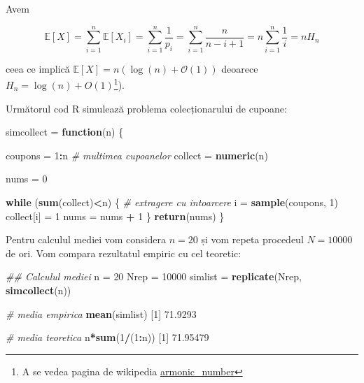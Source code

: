 \documentclass[]{article}
\newenvironment{Shaded}{\begin{snugshade}}{\end{snugshade}}
\newcommand{\CommentTok}[1]{\textcolor[rgb]{0.56,0.35,0.01}{\textit{#1}}}
\newcommand{\ControlFlowTok}[1]{\textcolor[rgb]{0.13,0.29,0.53}{\textbf{#1}}}
\newcommand{\DecValTok}[1]{\textcolor[rgb]{0.00,0.00,0.81}{#1}}
\newcommand{\FloatTok}[1]{\textcolor[rgb]{0.00,0.00,0.81}{#1}}
\newcommand{\KeywordTok}[1]{\textcolor[rgb]{0.13,0.29,0.53}{\textbf{#1}}}
\newcommand{\NormalTok}[1]{#1}
\newcommand{\OperatorTok}[1]{\textcolor[rgb]{0.81,0.36,0.00}{\textbf{#1}}}
\newcommand{\StringTok}[1]{\textcolor[rgb]{0.31,0.60,0.02}{#1}}
\let\rmarkdownfootnote\footnote%
\def\footnote{\protect\rmarkdownfootnote}
\begin{document}
Avem

\[
  \mathbb{E}[X] = \sum_{i = 1}^{n}\mathbb{E}[X_i] = \sum_{i = 1}^{n}\frac{1}{p_i} = \sum_{i = 1}^{n}\frac{n}{n-i+1} = n\sum_{i = 1}^{n}\frac{1}{i} = nH_n
\]

ceea ce implică
\(\mathbb{E}[X] = n\left(\log(n) + \mathcal{O}(1)\right)\) deoarece
\(H_n = \log(n)+O(1)\)\footnote{A se vedea pagina de wikipedia
  \href{https://en.wikipedia.org/wiki/Harmonic_number}{armonic\_number}}).

Următorul cod R simulează problema colecționarului de cupoane:

\begin{Shaded}
\begin{Highlighting}[]
\NormalTok{simcollect =}\StringTok{ }\ControlFlowTok{function}\NormalTok{(n) \{}
  
\NormalTok{coupons =}\StringTok{ }\DecValTok{1}\OperatorTok{:}\NormalTok{n }\CommentTok{# multimea cupoanelor}
\NormalTok{collect =}\StringTok{ }\KeywordTok{numeric}\NormalTok{(n)}

\NormalTok{nums =}\StringTok{ }\DecValTok{0}

\ControlFlowTok{while}\NormalTok{ (}\KeywordTok{sum}\NormalTok{(collect)}\OperatorTok{<}\NormalTok{n)}
\NormalTok{\{}
  \CommentTok{# extragere cu intoarcere}
\NormalTok{    i =}\StringTok{ }\KeywordTok{sample}\NormalTok{(coupons, }\DecValTok{1}\NormalTok{)}
\NormalTok{    collect[i] =}\StringTok{ }\DecValTok{1}
\NormalTok{    nums =}\StringTok{ }\NormalTok{nums }\OperatorTok{+}\StringTok{ }\DecValTok{1}
\NormalTok{\}}
\KeywordTok{return}\NormalTok{(nums)}
\NormalTok{\}}
\end{Highlighting}
\end{Shaded}

Pentru calculul mediei vom considera \(n = 20\) și vom repeta procedeul
\(N = 10000\) de ori. Vom compara rezultatul empiric cu cel teoretic:

\begin{Shaded}
\begin{Highlighting}[]
\CommentTok{## Calculul mediei}
\NormalTok{n =}\StringTok{ }\DecValTok{20}
\NormalTok{Nrep =}\StringTok{ }\DecValTok{10000}
\NormalTok{simlist =}\StringTok{ }\KeywordTok{replicate}\NormalTok{(Nrep, }\KeywordTok{simcollect}\NormalTok{(n))}

\CommentTok{# media empirica}
\KeywordTok{mean}\NormalTok{(simlist)}
\NormalTok{[}\DecValTok{1}\NormalTok{] }\FloatTok{71.9293}

\CommentTok{# media teoretica}
\NormalTok{n}\OperatorTok{*}\KeywordTok{sum}\NormalTok{(}\DecValTok{1}\OperatorTok{/}\NormalTok{(}\DecValTok{1}\OperatorTok{:}\NormalTok{n))}
\NormalTok{[}\DecValTok{1}\NormalTok{] }\FloatTok{71.95479}
\end{Highlighting}
\end{Shaded}
\end{document}
